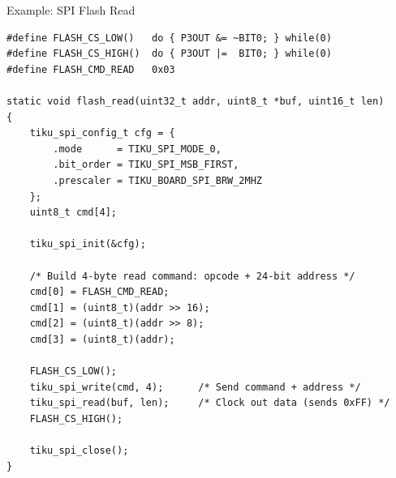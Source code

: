 \documentclass[aspectratio=169, 10pt]{beamer}
\begin{document}
\begin{frame}[fragile]{Example: SPI Flash Read}
\begin{lstlisting}[style=cstyle,
  title={SPI flash read --- W25Q SPI flash memory}]
#define FLASH_CS_LOW()   do { P3OUT &= ~BIT0; } while(0)
#define FLASH_CS_HIGH()  do { P3OUT |=  BIT0; } while(0)
#define FLASH_CMD_READ   0x03

static void flash_read(uint32_t addr, uint8_t *buf, uint16_t len)
{
    tiku_spi_config_t cfg = {
        .mode      = TIKU_SPI_MODE_0,
        .bit_order = TIKU_SPI_MSB_FIRST,
        .prescaler = TIKU_BOARD_SPI_BRW_2MHZ
    };
    uint8_t cmd[4];

    tiku_spi_init(&cfg);

    /* Build 4-byte read command: opcode + 24-bit address */
    cmd[0] = FLASH_CMD_READ;
    cmd[1] = (uint8_t)(addr >> 16);
    cmd[2] = (uint8_t)(addr >> 8);
    cmd[3] = (uint8_t)(addr);

    FLASH_CS_LOW();
    tiku_spi_write(cmd, 4);      /* Send command + address */
    tiku_spi_read(buf, len);     /* Clock out data (sends 0xFF) */
    FLASH_CS_HIGH();

    tiku_spi_close();
}
\end{lstlisting}
\end{frame}
\end{document}
